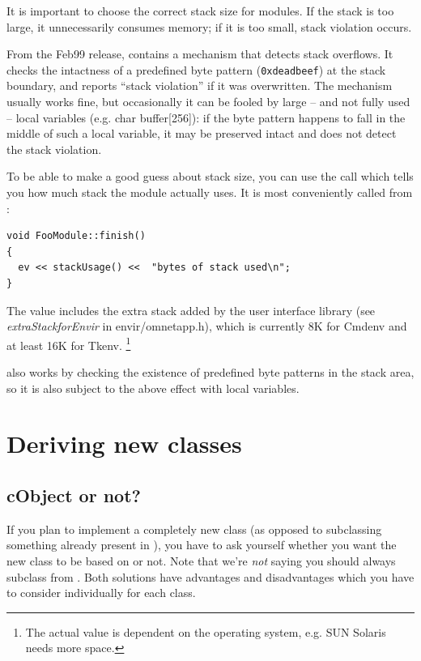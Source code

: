 It is important to choose the correct stack size for
modules.  If the stack is
too large, it unnecessarily consumes memory; if it is too small, stack
violation occurs.

From the Feb99 release, {\opp} contains a mechanism that detects stack
overflows. It checks the intactness of a
predefined byte pattern (\texttt{0xdeadbeef}) at the stack boundary,
and reports ``stack violation'' if it was
overwritten. The mechanism usually works fine, but occasionally it can
be fooled by large -- and not fully used -- local variables (e.g. char
buffer[256]): if the byte pattern happens to fall in the middle of
such a local variable, it may be preserved intact and {\opp} does not
detect the stack violation.

To be able to make a good guess about stack size, you can use
the  call which tells you how much stack the module
actually uses. It is most conveniently called from :

\begin{verbatim}
void FooModule::finish()
{
  ev << stackUsage() <<  "bytes of stack used\n";
}
\end{verbatim}


The value includes the extra stack added by the user interface library
(see \textit{extraStackforEnvir} in
envir/omnetapp.h), which is currently 8K for Cmdenv and at least 16K
for Tkenv.
  \footnote{The actual value is dependent on the operating
  system, e.g. SUN Solaris needs more space.}

also works by checking the existence of predefined
byte patterns in the stack area, so it is also subject to the above
effect with local variables.



\section{Deriving new classes}
\label{sec:ch-sim-lib:deriving-new-classes}

\subsection{cObject or not?}

If you plan to implement a completely new class (as opposed to
subclassing something already present in {\opp}), you have
to ask yourself whether you want the new class to be based
on  or not.
Note that we're \textit{not} saying you should always
subclass from .
Both solutions have advantages and disadvantages which you
have to consider individually for each class.

